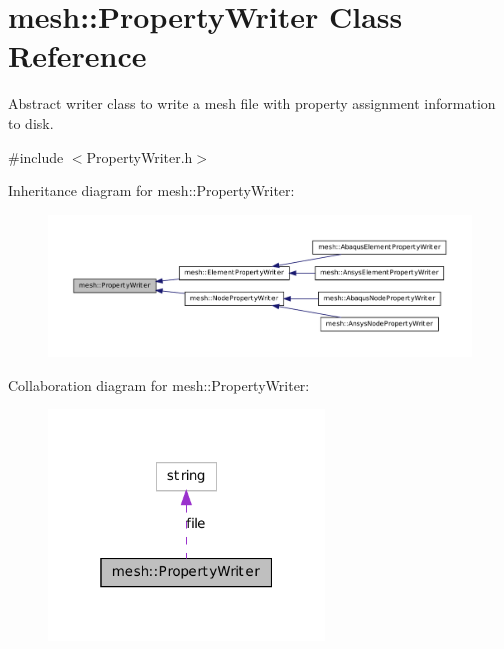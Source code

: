 \hypertarget{classmesh_1_1_property_writer}{
\section{mesh::PropertyWriter Class Reference}
\label{classmesh_1_1_property_writer}
}


Abstract writer class to write a mesh file with property assignment information to disk.  




{\ttfamily \#include $<$PropertyWriter.h$>$}



Inheritance diagram for mesh::PropertyWriter:\nopagebreak
\begin{figure}[H]
\begin{center}
\leavevmode
\includegraphics[width=400pt]{classmesh_1_1_property_writer__inherit__graph}
\end{center}
\end{figure}


Collaboration diagram for mesh::PropertyWriter:\nopagebreak
\begin{figure}[H]
\begin{center}
\leavevmode
\includegraphics[width=208pt]{classmesh_1_1_property_writer__coll__graph}
\end{center}
\end{figure}
